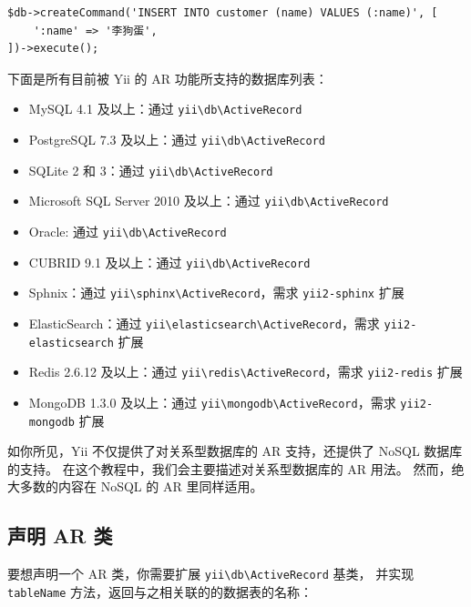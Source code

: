 \lstset{language=php}\begin{lstlisting}
$db->createCommand('INSERT INTO customer (name) VALUES (:name)', [
    ':name' => '李狗蛋',
])->execute();
\end{lstlisting}
下面是所有目前被 Yii 的 AR 功能所支持的数据库列表：

\begin{itemize}
\item MySQL 4.1 及以上：通过 \texttt{yii{\allowbreak{}\textbackslash}db{\allowbreak{}\textbackslash}ActiveRecord}
\item PostgreSQL 7.3 及以上：通过 \texttt{yii{\allowbreak{}\textbackslash}db{\allowbreak{}\textbackslash}ActiveRecord}
\item SQLite 2 和 3：通过 \texttt{yii{\allowbreak{}\textbackslash}db{\allowbreak{}\textbackslash}ActiveRecord}
\item Microsoft SQL Server 2010 及以上：通过 \texttt{yii{\allowbreak{}\textbackslash}db{\allowbreak{}\textbackslash}ActiveRecord}
\item Oracle: 通过 \texttt{yii{\allowbreak{}\textbackslash}db{\allowbreak{}\textbackslash}ActiveRecord}
\item CUBRID 9.1 及以上：通过 \texttt{yii{\allowbreak{}\textbackslash}db{\allowbreak{}\textbackslash}ActiveRecord}
\item Sphnix：通过 \texttt{yii{\allowbreak{}\textbackslash}sphinx{\allowbreak{}\textbackslash}ActiveRecord}，需求 \lstinline|yii2-sphinx| 扩展
\item ElasticSearch：通过 \texttt{yii{\allowbreak{}\textbackslash}elasticsearch{\allowbreak{}\textbackslash}ActiveRecord}，需求 \lstinline|yii2-elasticsearch| 扩展
\item Redis 2.6.12 及以上：通过 \texttt{yii{\allowbreak{}\textbackslash}redis{\allowbreak{}\textbackslash}ActiveRecord}，需求 \lstinline|yii2-redis| 扩展
\item MongoDB 1.3.0 及以上：通过 \texttt{yii{\allowbreak{}\textbackslash}mongodb{\allowbreak{}\textbackslash}ActiveRecord}，需求 \lstinline|yii2-mongodb| 扩展
\end{itemize}
如你所见，Yii 不仅提供了对关系型数据库的 AR 支持，还提供了 NoSQL 数据库的支持。
在这个教程中，我们会主要描述对关系型数据库的 AR 用法。
然而，绝大多数的内容在 NoSQL 的 AR 里同样适用。

\subsection{声明 AR 类}
要想声明一个 AR 类，你需要扩展 \texttt{yii{\allowbreak{}\textbackslash}db{\allowbreak{}\textbackslash}ActiveRecord} 基类，
并实现 \lstinline|tableName| 方法，返回与之相关联的的数据表的名称：

